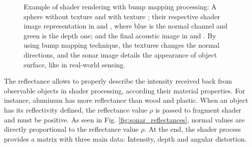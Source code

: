 \documentclass[final,5p,times]{elsarticle}
\begin{document}
\begin{figure}[t]
{        \label{fig:bump_5}
    }
    \captionsetup{justification=centering}
    \caption{Example of shader rendering with bump mapping processing: A sphere without texture  and with texture ; their respective shader image representation in  and , where blue is the normal channel and green is the depth one; and the final acoustic image in  and . By using bump mapping technique, the textures changes the normal directions, and the sonar image details the appearance of object surface, like in real-world sensing.}
    \label{fig:sonar_bump_mapping}
\end{figure}

The reflectance allows to properly describe the intensity received back from observable objects in shader processing, according their material properties. For instance, aluminum has more reflectance than wood and plastic. When an object has its reflectivity defined, the reflectance value $\rho$ is passed to fragment shader and must be positive. As seen in Fig. \ref{fig:sonar_reflectances}, normal values are directly proportional to the reflectance value $\rho$. At the end, the shader process provides a matrix with three main data: Intensity, depth and angular distortion.
\end{document}
